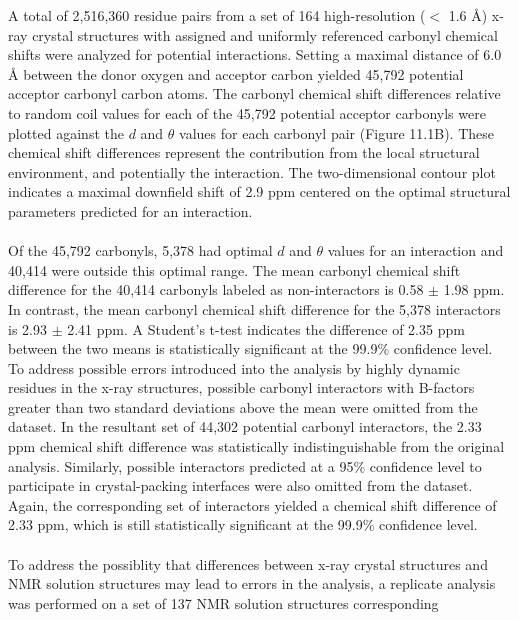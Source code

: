 \begin{doublespace}
A total of 2,516,360 residue pairs from a set of 164 high-resolution
($<$ 1.6 \r{A}) x-ray crystal structures with assigned and uniformly referenced
carbonyl \cnmr{} chemical shifts were analyzed for potential \npistar{}
interactions. Setting a maximal distance of 6.0 \r{A} between the donor oxygen
and acceptor carbon yielded 45,792 potential acceptor carbonyl carbon atoms.
The carbonyl \cnmr{} chemical shift differences relative to random coil values
for each of the 45,792 potential acceptor carbonyls were plotted against the
$d$ and $\theta$ values for each carbonyl pair (Figure 11.1B). These chemical
shift differences represent the contribution from the local structural
environment, and potentially the \npistar{} interaction. The two-dimensional
contour plot indicates a maximal downfield shift of 2.9 ppm centered on the
optimal structural parameters predicted for an \npistar{} interaction.
\\\\
Of the 45,792 carbonyls, 5,378 had optimal $d$ and $\theta$ values for an
\npistar{} interaction and 40,414 were outside this optimal range. The mean
carbonyl \cnmr{} chemical shift difference for the 40,414 carbonyls labeled as
non-interactors is 0.58 $\pm$ 1.98 ppm. In contrast, the mean carbonyl \cnmr{}
chemical shift difference for the 5,378 interactors is 2.93 $\pm$ 2.41 ppm. A
Student's t-test indicates the difference of 2.35 ppm between the two means is
statistically significant at the 99.9\% confidence level. To address possible
errors introduced into the analysis by highly dynamic residues in the x-ray
structures, possible carbonyl interactors with B-factors greater than two
standard deviations above the mean were omitted from the dataset. In the
resultant set of 44,302 potential carbonyl interactors, the 2.33 ppm chemical
shift difference was statistically indistinguishable from the original
analysis. Similarly, possible interactors predicted at a 95\% confidence level
to participate in crystal-packing interfaces were also omitted from the
dataset. Again, the corresponding set of interactors yielded a chemical shift
difference of 2.33 ppm, which is still statistically significant at the 99.9\%
confidence level.
\\\\
To address the possiblity that differences between x-ray crystal structures
and NMR solution structures may lead to errors in the analysis, a replicate
analysis was performed on a set of 137 NMR solution structures corresponding

\end{doublespace}

